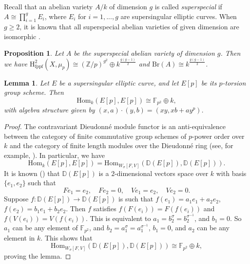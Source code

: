 \documentclass[a4paper,12pt,twoside]{report}
\newtheorem{proposition}[theorem]{Proposition}
\newtheorem{lemma}[theorem]{Lemma}
\newcommand{\Z}{\mathbb{Z}}
\newcommand{\F}{\mathbb{F}}
\newcommand{\fppf}{\mathrm{fppf}}
\newcommand{\Br}{\mathrm{Br}}
\newcommand{\HH}{\mathrm{H}}
\newcommand{\Hom}{\mathrm{Hom}}
\begin{document}
Recall that an abelian variety $A/k$ of dimension $g$ is called {\em superspecial}
if $A\cong\prod_{i=1}^g  E_i$, where $E_i$ for $i=1,...,g$ are
supersingular elliptic curves. When \(g\geqslant 2\), it is known 
that all superspecial abelian varieties of given dimension are isomorphic \cite[Theorem 2]{Oo2a}.

\begin{proposition}\label{Superspecial}
Let $A$ be the superspecial abelian variety of dimension $g$.
    Then we have $\HH^2_{\fppf}(X,\mu_p)\cong (\Z/p)^{g^2}\oplus k^{\frac{g(g-1)}{2}}$
and $\Br(A)\cong k^{ \frac{g(g-1)}{2}}$. 
\end{proposition}

\begin{lemma}\label{Homlemma}
    Let $E$ be a supersingular elliptic curve, and let $E[p]$ be its $p$-torsion group scheme. 
    Then 
    \begin{equation*}
        \Hom_k(E[p],E[p])\cong \F_{p^2} \oplus k,
    \end{equation*}
    with algebra structure given by $(x,a)\cdot(y,b)=(xy,xb+ay^p)$. 
\end{lemma}
\begin{proof} The contravariant Dieudonné module functor is an anti-equivalence 
between the category of finite commutative group schemes of $p$-power order over $k$ 
and the category of finite length modules over the Dieudonné ring (see, for example, \cite[Theorem III.1]{Fon}). In particular, we have 
\begin{equation*}
    \Hom_k(E[p],E[p])=\Hom_{W_{\sigma}[F,V]}(\mathbb{D}(E[p]),\mathbb{D}(E[p])). 
\end{equation*}
It is known (\cite[Chapter III]{De}) that $\mathbb{D}(E[p])$ is a 
$2$-dimensional vectors space over $k$ with basis $\{e_1,e_2\}$ such that 
\begin{equation*}
    Fe_1=e_2, \quad Fe_2=0, \quad Ve_1=e_2, \quad Ve_2=0.
\end{equation*}
Suppose $f:\mathbb{D}(E[p])\rightarrow \mathbb{D}(E[p])$ is
such that $f(e_1)=a_1e_1+a_2e_2$, $f(e_2)=b_1e_1+b_2e_2$. Then
$f$ satisfies $f(F(e_i))=F(f(e_i))$ and $f(V(e_i))=V(f(e_i))$. 
This is equivalent to $a_1=b_2^{\sigma}=b_2^{\sigma^{-1}}$, and $b_1=0$. 
So $a_1$ can be any element of $\F_{p^2}$, and $b_2=a_1^{\sigma}=a_1^{\sigma^{-1}}$, $b_1=0$, and $a_2$ can be any element in $k$. 
This shows that 
\[ \Hom_{W_{\sigma}[F,V]}(\mathbb{D}(E[p]),\mathbb{D}(E[p]))\cong \F_{p^2}\oplus k, \]
proving the lemma. \end{proof}
\end{document}
